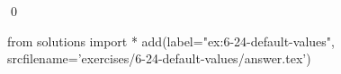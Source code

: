 
\begin{ex}
  \label{ex:6-24-default-values}
  
  \qed
\end{ex}
\begin{python0}
from solutions import *
add(label="ex:6-24-default-values",
    srcfilename='exercises/6-24-default-values/answer.tex')
\end{python0}
